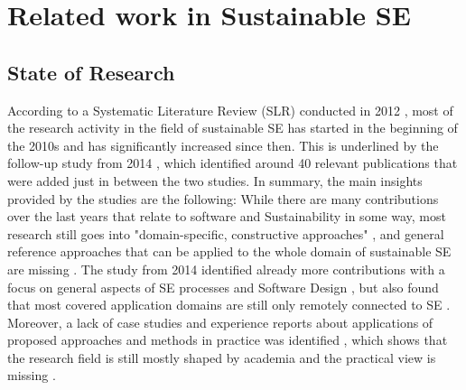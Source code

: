 \documentclass[oribibl]{llncs}
\begin{document}
\section{Related work in Sustainable SE} 
\subsection{State of Research\label{stateOfResearch}} %
According to a Systematic Literature Review (SLR) conducted in 2012 \cite{penzenstadler_sustainability_2012}, most of the research activity in the field of sustainable SE has started in the beginning of the 2010s and has significantly increased since then. This is underlined by the follow-up study from 2014 \cite{penzenstadler_systematic_2014}, which identified around 40 relevant publications that were added just in between the two studies. In summary, the main insights provided by the studies are the following: While there are many contributions over the last years that relate to software and Sustainability in some way, most research still goes into "domain-specific, constructive approaches" \cite[p.\,5]{penzenstadler_sustainability_2012}, and general reference approaches that can be applied to the whole domain of sustainable SE are missing \cite{penzenstadler_sustainability_2012}. The study from 2014 identified already more contributions with a focus on general aspects of SE processes and Software Design \cite{penzenstadler_systematic_2014}, but also found that most covered application domains are still only remotely connected to SE \cite{penzenstadler_systematic_2014}. Moreover, a lack of case studies and experience reports about applications of proposed approaches and methods in practice was identified \cite{penzenstadler_sustainability_2012}, which shows that the research field is still mostly shaped by academia and the practical view is missing \cite{penzenstadler_systematic_2014}.\\
\end{document}
